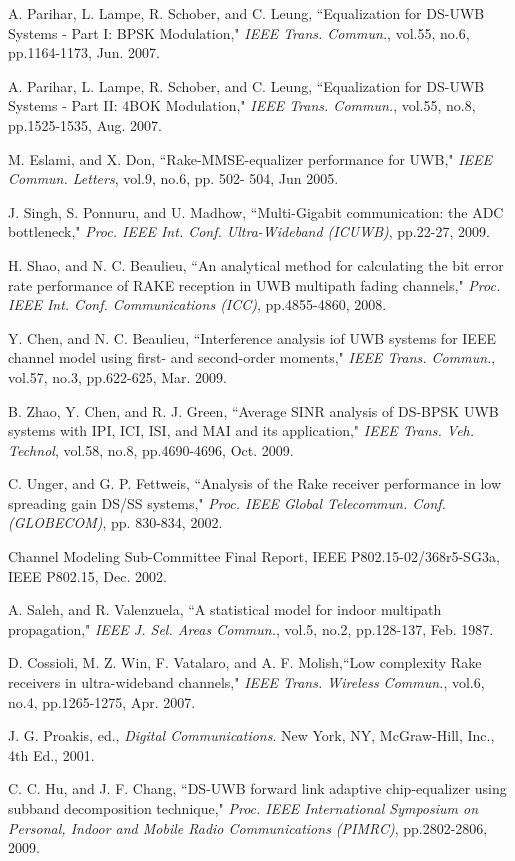 \documentclass[journal]{IEEEtran}
\begin{document}
\begin{thebibliography}{10}
A. Parihar, L. Lampe, R. Schober, and C. Leung, ``Equalization for
DS-UWB Systems - Part I: BPSK Modulation," {\it IEEE Trans.
Commun.}, vol.55, no.6, pp.1164-1173, Jun. 2007.

A. Parihar, L. Lampe, R. Schober, and C. Leung, ``Equalization for
DS-UWB Systems - Part II: 4BOK Modulation," {\it IEEE Trans.
Commun.}, vol.55, no.8, pp.1525-1535, Aug. 2007.

M. Eslami, and X. Don, ``Rake-MMSE-equalizer performance for UWB,"
{\it IEEE Commun. Letters}, vol.9, no.6, pp. 502- 504, Jun 2005.

J. Singh, S. Ponnuru, and U. Madhow, ``Multi-Gigabit communication:
the ADC bottleneck," {\it Proc. IEEE Int. Conf. Ultra-Wideband
(ICUWB)}, pp.22-27, 2009.

H. Shao, and N. C. Beaulieu, ``An analytical method for calculating
the bit error rate performance of RAKE reception in UWB multipath
fading channels," {\it Proc. IEEE Int. Conf. Communications (ICC)},
pp.4855-4860, 2008.


Y. Chen, and N. C. Beaulieu, ``Interference analysis iof UWB systems
for IEEE channel model using first- and second-order moments," {\it
IEEE Trans. Commun.}, vol.57, no.3, pp.622-625, Mar. 2009.




B. Zhao, Y. Chen, and R. J. Green, ``Average SINR analysis of
DS-BPSK UWB systems with IPI, ICI, ISI, and MAI and its
application," {\it IEEE Trans. Veh. Technol}, vol.58, no.8,
pp.4690-4696, Oct. 2009.

C. Unger, and G. P. Fettweis, ``Analysis of the Rake receiver
performance in low spreading gain DS/SS systems," {\it Proc. IEEE
Global Telecommun. Conf. (GLOBECOM)}, pp. 830-834, 2002.

Channel Modeling Sub-Committee Final Report, IEEE
P802.15-02/368r5-SG3a, IEEE P802.15, Dec. 2002.

A. Saleh, and R. Valenzuela, ``A statistical model for indoor
multipath propagation," {\it IEEE J. Sel. Areas Commun.}, vol.5,
no.2, pp.128-137, Feb. 1987.

D. Cossioli, M. Z. Win, F. Vatalaro, and A. F. Molish,``Low
complexity Rake receivers in ultra-wideband channels," {\it IEEE
Trans. Wireless Commun.}, vol.6, no.4, pp.1265-1275, Apr. 2007.




J. G. Proakis, ed., {\it Digital Communications}. New York, NY,
McGraw-Hill, Inc., 4th Ed., 2001.

C. C. Hu, and J. F. Chang, ``DS-UWB forward link adaptive
chip-equalizer using subband decomposition technique," {\it Proc.
IEEE International Symposium on Personal, Indoor and Mobile Radio
Communications (PIMRC)}, pp.2802-2806, 2009.





\end{thebibliography}
\end{document}
